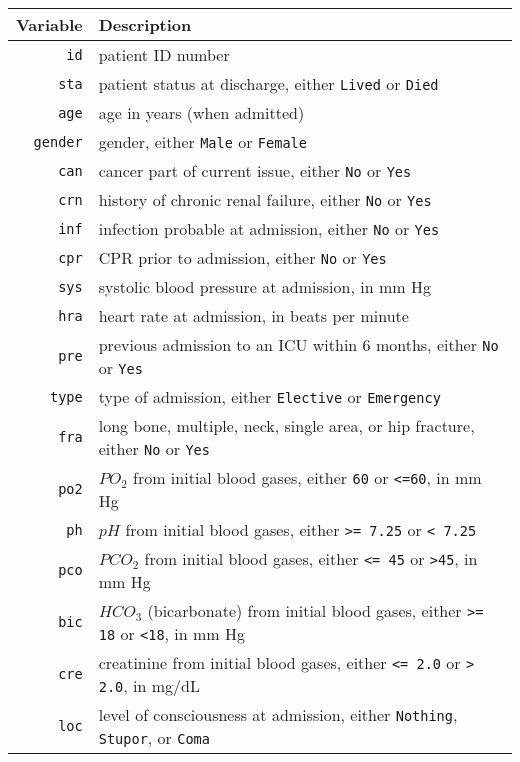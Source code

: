\documentclass[letterpaper,12pt,twoside,]{pinp}
\begin{document}
\begin{center}
\begin{tabular}{r|l}
\textbf{Variable} & \textbf{Description} \\
\hline
\texttt{id} & patient ID number \\
\texttt{sta} & patient status at discharge, either \texttt{Lived} or \texttt{Died} \\
\texttt{age} & age in years (when admitted) \\
\texttt{gender} & gender, either \texttt{Male} or \texttt{Female} \\
\texttt{can} & cancer part of current issue, either \texttt{No} or \texttt{Yes} \\
\texttt{crn} & history of chronic renal failure, either \texttt{No} or \texttt{Yes}\\
\texttt{inf} & infection probable at admission, either \texttt{No} or \texttt{Yes} \\
\texttt{cpr} & CPR prior to admission, either \texttt{No} or \texttt{Yes} \\
\texttt{sys} & systolic blood pressure at admission, in mm Hg \\
\texttt{hra} & heart rate at admission, in beats per minute \\
\texttt{pre} & previous admission to an ICU within 6 months, either \texttt{No} or \texttt{Yes} \\
\texttt{type} & type of admission, either \texttt{Elective} or \texttt{Emergency} \\
\texttt{fra} & long bone, multiple, neck, single area, or hip fracture, either \texttt{No} or \texttt{Yes} \\
\texttt{po2} & $PO_2$ from initial blood gases, either \texttt{60} or \texttt{<=60}, in mm Hg\\
\texttt{ph} & $pH$ from initial blood gases, either \texttt{>= 7.25} or \texttt{< 7.25} \\
\texttt{pco} & $PCO_2$ from initial blood gases, either \texttt{<= 45} or \texttt{>45}, in mm Hg \\
\texttt{bic} & $HCO_3$ (bicarbonate) from initial blood gases, either \texttt{>= 18} or \texttt{<18}, in mm Hg \\
\texttt{cre} & creatinine from initial blood gases, either \texttt{<= 2.0} or \texttt{> 2.0}, in mg/dL \\
\texttt{loc} & level of consciousness at admission, either \texttt{Nothing}, \texttt{Stupor}, or \texttt{Coma}
\end{tabular}
\end{center}
\end{document}
